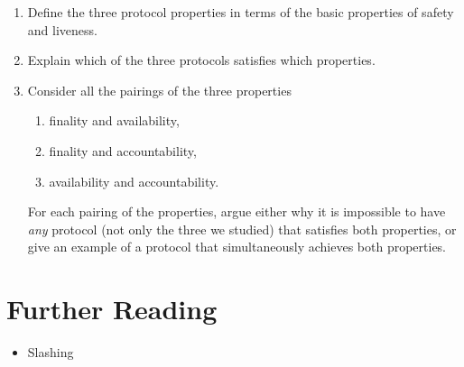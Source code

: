 \begin{problems}
        \begin{enumerate}
            \item Define the three protocol properties in terms of the basic properties
                of safety and liveness.
            \item Explain which of the three protocols satisfies which properties.
            \item Consider all the pairings of the three properties
            \begin{enumerate}
                \item finality and availability,
                \item finality and accountability,
                \item availability and accountability.
            \end{enumerate}
            For each pairing of the properties, argue either why it is impossible to
            have {\em any} protocol (not only the three we studied) that satisfies both
            properties, or give an example of a protocol that simultaneously achieves
            both properties.
        \end{enumerate}



\end{problems}

\section*{Further Reading}

{\color{red}
\begin{itemize}
\item Slashing
\end{itemize}
}
